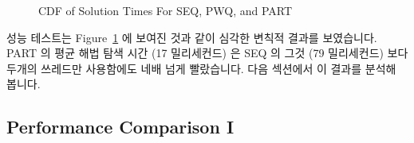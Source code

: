 \begin{figure}[tb]
\begin{center}
\end{center}
\caption{CDF of Solution Times For SEQ, PWQ, and PART}
\label{fig:SMPdesign:CDF of Solution Times For SEQ, PWQ, and PART}
\end{figure}

성능 테스트는
Figure~\ref{fig:SMPdesign:CDF of Solution Times For SEQ, PWQ, and PART} 에
보여진 것과 같이 심각한 변칙적 결과를 보였습니다.
PART 의 평균 해법 탐색 시간 (17 밀리세컨드) 은 SEQ 의 그것 (79 밀리세컨드) 보다
두개의 쓰레드만 사용함에도 네배 넘게 빨랐습니다.
다음 섹션에서 이 결과를 분석해 봅니다.

\subsection{Performance Comparison I}
\label{sec:SMPdesign:Performance Comparison I}

